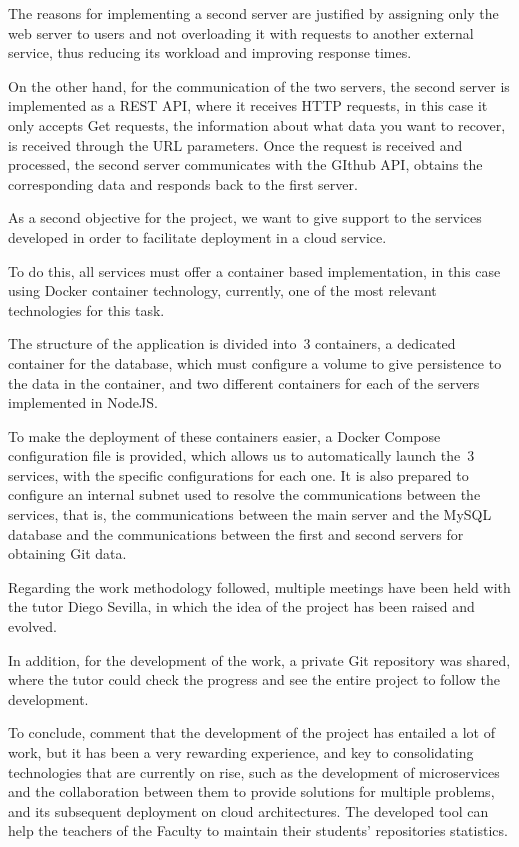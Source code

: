 The reasons for implementing a second server are justified by
assigning only the web server to users and not overloading it with
requests to another external service, thus reducing its workload and
improving response times.

On the other hand, for the communication of the two servers, the
second server is implemented as a REST API, where it receives HTTP
requests, in this case it only accepts Get requests, the information
about what data you want to recover, is received through the URL
parameters. Once the request is received and processed, the second
server communicates with the GIthub API, obtains the corresponding
data and responds back to the first server.

As a second objective for the project, we want to give support to the
services developed in order to facilitate deployment in a cloud
service.

To do this, all services must offer a container based implementation,
in this case using Docker\cite{Docker} container technology,
currently, one of the most relevant technologies for this task.

The structure of the application is divided into~3 containers, a
dedicated container for the database, which must configure a volume to
give persistence to the data in the container, and two different
containers for each of the servers implemented in NodeJS.

To make the deployment of these containers easier, a Docker Compose
configuration file is provided, which allows us to automatically
launch the~3 services, with the specific configurations for each one.
It is also prepared to configure an internal subnet used to resolve
the communications between the services, that is, the communications
between the main server and the MySQL database and the communications
between the first and second servers for obtaining Git data.

Regarding the work methodology followed, multiple meetings have been
held with the tutor Diego Sevilla, in which the idea of the project
has been raised and evolved.


In addition, for the development of the work, a private Git repository
was shared, where the tutor could check the progress and see the
entire project to follow the development.

To conclude, comment that the development of the project has entailed
a lot of work, but it has been a very rewarding experience, and key to
consolidating technologies that are currently on rise, such as the
development of microservices and the collaboration between them to
provide solutions for multiple problems, and its subsequent deployment
on cloud architectures. The developed tool can help the teachers of
the Faculty to maintain their students' repositories statistics.


